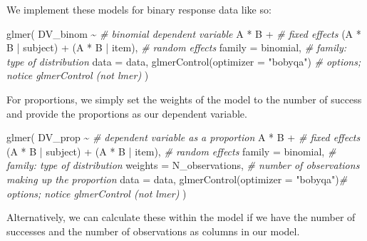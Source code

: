 \documentclass[
]{book}
\newenvironment{Shaded}{\begin{snugshade}}{\end{snugshade}}
\newcommand{\AttributeTok}[1]{\textcolor[rgb]{0.77,0.63,0.00}{#1}}
\newcommand{\CommentTok}[1]{\textcolor[rgb]{0.56,0.35,0.01}{\textit{#1}}}
\newcommand{\FunctionTok}[1]{\textcolor[rgb]{0.00,0.00,0.00}{#1}}
\newcommand{\NormalTok}[1]{#1}
\newcommand{\SpecialCharTok}[1]{\textcolor[rgb]{0.00,0.00,0.00}{#1}}
\newcommand{\StringTok}[1]{\textcolor[rgb]{0.31,0.60,0.02}{#1}}
\begin{document}
We implement these models for binary response data like so:

\begin{Shaded}
\begin{Highlighting}[]
\FunctionTok{glmer}\NormalTok{(}
\NormalTok{  DV\_binom }\SpecialCharTok{\textasciitilde{}} \CommentTok{\# binomial dependent variable}
\NormalTok{    A }\SpecialCharTok{*}\NormalTok{ B }\SpecialCharTok{+} \CommentTok{\# fixed effects}
\NormalTok{    (A }\SpecialCharTok{*}\NormalTok{ B }\SpecialCharTok{|}\NormalTok{ subject) }\SpecialCharTok{+}\NormalTok{ (A }\SpecialCharTok{*}\NormalTok{ B }\SpecialCharTok{|}\NormalTok{ item), }\CommentTok{\# random effects }
  \AttributeTok{family =}\NormalTok{ binomial, }\CommentTok{\# family: type of distribution}
  \AttributeTok{data =}\NormalTok{ data, }
  \FunctionTok{glmerControl}\NormalTok{(}\AttributeTok{optimizer =} \StringTok{"bobyqa"}\NormalTok{) }\CommentTok{\# options; notice glmerControl (not lmer)}
\NormalTok{  )}
\end{Highlighting}
\end{Shaded}

For proportions, we simply set the weights of the model to the number of success and provide the proportions as our dependent variable.

\begin{Shaded}
\begin{Highlighting}[]
\FunctionTok{glmer}\NormalTok{(}
\NormalTok{  DV\_prop }\SpecialCharTok{\textasciitilde{}} \CommentTok{\# dependent variable as a proportion}
\NormalTok{    A }\SpecialCharTok{*}\NormalTok{ B }\SpecialCharTok{+} \CommentTok{\# fixed effects}
\NormalTok{    (A }\SpecialCharTok{*}\NormalTok{ B }\SpecialCharTok{|}\NormalTok{ subject) }\SpecialCharTok{+}\NormalTok{ (A }\SpecialCharTok{*}\NormalTok{ B }\SpecialCharTok{|}\NormalTok{ item), }\CommentTok{\# random effects }
  \AttributeTok{family =}\NormalTok{ binomial, }\CommentTok{\# family: type of distribution}
  \AttributeTok{weights =}\NormalTok{ N\_observations, }\CommentTok{\# number of observations making up the proportion}
  \AttributeTok{data =}\NormalTok{ data,}
  \FunctionTok{glmerControl}\NormalTok{(}\AttributeTok{optimizer =} \StringTok{"bobyqa"}\NormalTok{)}\CommentTok{\# options; notice glmerControl (not lmer)}
\NormalTok{  )}
\end{Highlighting}
\end{Shaded}

Alternatively, we can calculate these within the model if we have the number of successes and the number of observations as columns in our model.
\end{document}

